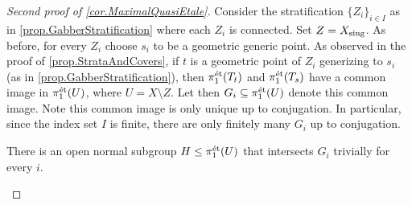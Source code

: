\documentclass[12pt]{amsart}
\numberwithin{equation}{theorem}
\renewcommand{\:}{\colon}
\theoremstyle{theorem}
\renewcommand{\O}{\mathscr O}
\begin{document}
\begin{proof} [Second proof of \autoref{cor.MaximalQuasiEtale}]
Consider the stratification $\{ Z_i \}_{i \in I}$ as in \autoref{prop.GabberStratification} where each $Z_i$ is connected.  Set $Z = X_{\operatorname{{sing}}}$.
As before, for every $Z_i$ choose $s_i$ to be a geometric generic point.
As observed in the proof of \autoref{prop.StrataAndCovers}, if $t$ is a geometric point of $Z_i$ generizing to $s_i$ (as in \autoref{prop.GabberStratification}), then $\pi_1^{\textnormal{{\'e}t}}(T_t)$ and $\pi_1^{\textnormal{{\'e}t}}(T_s)$ have a common image in $\pi_1^{\textnormal{{\'e}t}}(U)$, where $U = X \setminus Z$. %
Let then $G_i \subseteq \pi_1^{\textnormal{{\'e}t}}(U)$ denote this common image.
Note this common image is only unique up to conjugation.
In particular, since the index set $I$ is finite, there are only finitely many $G_i$ up to conjugation.

\begin{claim}
There is an open normal subgroup $H \leq \pi_1^{\textnormal{{\'e}t}}(U)$ that intersects $G_i$ trivially for every $i$.%
\end{claim}


\end{proof}
\end{document}
